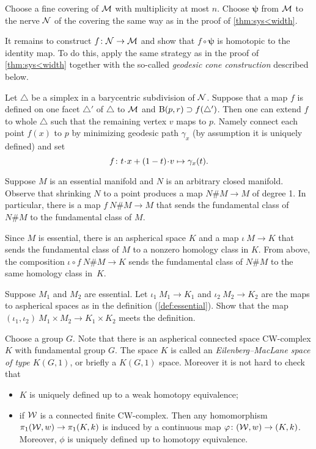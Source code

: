 Choose a fine covering of $\mathcal{M}$ with multiplicity at most $n$.
Choose $\bm{\psi}$ from $\mathcal{M}$ to the nerve $\mathcal{N}$ of the covering the same way as in the proof of \ref{thm:sys<width}.

It remains to construct $f\colon\mathcal{N}\to\mathcal{M}$ and show that $f\circ\bm{\psi}$ is homotopic to the identity map.
To do this, apply the same strategy as in the proof of \ref{thm:sys<width} together with the so-called \emph{geodesic cone construction}
described below.

Let $\triangle$ be a simplex in a barycentric subdivision of $\mathcal{N}$.
Suppose that a map $f$ is defined on one facet $\triangle'$ of $\triangle$ to $\mathcal{M}$ and $\mathrm{B}{}(p,r)\supset f(\triangle')$.
Then one can extend $f$ to whole $\triangle$ such that the remaining vertex $v$ maps to $p$.
Namely connect each point $f(x)$ to $p$ by minimizing geodesic path $\gamma_x$ (by assumption it is uniquely defined) and set
\[f
\:
t\cdot x\z+(1-t)\cdot v
\mapsto
\gamma_x(t).\]

Suppose $M$ is an essential manifold and $N$ is an arbitrary closed manifold.
Observe that shrinking $N$ to a point produces a map $N\#M\to M$ of degree 1.
In particular, there is a map $f\:N\#M\to M$ that sends the fundamental class of $N\#M$ to the fundamental class of $M$.

Since $M$ is essential, there is an aspherical space $K$ and a map $\iota\:M\to K$ that sends the fundamental class of $M$ to a nonzero homology class in $K$.
From above, the composition $\iota\circ f\:N\#M\to K$ sends the fundamental class of $N\#M$ to the same homology class in~$K$.


Suppose $M_1$ and $M_2$ are essential.
Let $\iota_1\:M_1\to K_1$ and $\iota_2\:M_2\to K_2$ are the maps to aspherical spaces as in the definition (\ref{def:essential}).
Show that the map
$(\iota_1,\iota_2)\:M_1\times M_2\to K_1\times K_2$
meets the definition.

Choose a group $G$.
Note that there is an aspherical connected space CW-complex $K$ with fundamental group $G$.
The space $K$ is called an \emph{Eilenberg--MacLane space of type $K(G,1)$}, or briefly a $K(G,1)$ space.
Moreover it is not hard to check that
\begin{itemize}
\item $K$ is uniquely defined up to a weak homotopy equivalence;
\item if $\mathcal{W}$ is a connected finite CW-complex.
Then any homomorphism $\pi_1(\spc{W},w)\z\to\pi_1(K,k)$ is induced by a continuous map $\varphi\colon(\mathcal{W},w)\to(K,k)$.
Moreover, $\phi$ is uniquely defined up to homotopy equivalence.
\end{itemize}

